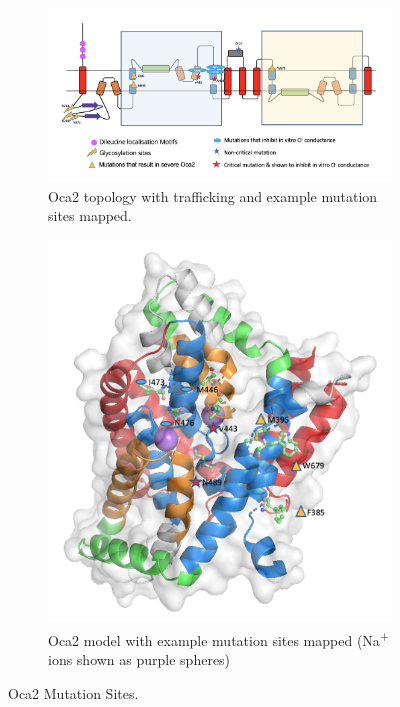 \begin{figure}[htb]
    \centering %
\begin{subfigure}{0.7\textwidth}
  \includegraphics[width=\linewidth]{oca2/oca2_5a.png}
  \caption{Oca2 topology with trafficking and example mutation sites mapped.}
  \label{fig:oca2_5a}
\end{subfigure}\hfil %
\begin{subfigure}{0.4\textwidth}
  \includegraphics[width=\linewidth]{oca2/oca2_5b.png}
  \caption{Oca2 model with example mutation sites mapped (Na\textsuperscript{+} ions shown as purple spheres)}
  \label{fig:oca2_5b}
\end{subfigure}
\caption{Oca2 Mutation Sites.}
\small

\label{fig:oca2_5}
\end{figure}



